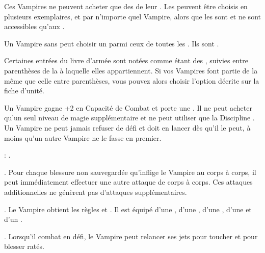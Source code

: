 
Ces Vampires ne peuvent acheter que des \bloodpowers{} de leur \bloodline{} . Les \bloodlinepowers{} peuvent être choisis en plusieurs exemplaires, et par n'importe quel Vampire, alors que les \ancientbloodpowers{} sont \oneofakind{} et ne sont accessibles qu'aux \vampirelords{}.


Un Vampire sans \bloodline{} peut choisir un \bloodlinepowers{} parmi ceux de toutes les \bloodlines{}. Ils sont \oneofakind{}.

Certaines entrées du livre d'armée sont notées comme étant des \bloodties{}, suivies entre parenthèses de la \bloodline{} à laquelle elles appartiennent. Si vos Vampires font partie de la même \bloodline{} que celle entre parenthèses, vous pouvez alors choisir l'option décrite sur la fiche d'unité.


\separator


Un Vampire \brotherhood{} gagne +2 en Capacité de Combat et porte une \platearmour{}. Il ne peut acheter qu'un seul niveau de magie supplémentaire et ne peut utiliser que la Discipline \necromancy{}. Un Vampire \brotherhood{} ne peut jamais refuser de défi et doit en lancer dès qu'il le peut, à moins qu'un autre Vampire \brotherhood{} ne le fasse en premier.

\bloodties{}: \vampireknights{}.

\startpricelist

 \textbf{\ancientbloodpower}. Pour chaque blessure non sauvegardée qu'inflige le Vampire au corps à corps, il peut immédiatement effectuer une autre attaque de corps à corps. Ces attaques additionnelles ne génèrent pas d'attaques supplémentaires.

 \textbf{\bloodlinepower}. Le Vampire obtient les règles \weaponmaster{} et . Il est équipé d'une \ahw{}, d'une \halberd{}, d'une \gw{}, d'une \lance{} et d'un \shield{}.

 \textbf{\bloodlinepower}. Lorsqu'il combat en défi, le Vampire peut relancer ses jets pour toucher et pour blesser ratés.

\endpricelist

\separator

